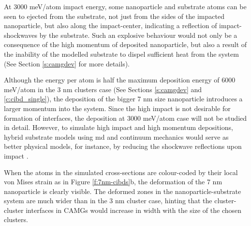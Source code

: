 At 3000 meV/atom impact energy, some nanoparticle and substrate atoms can be seen to ejected from the substrate, not just from the sides of the impacted nanoparticle, but also along the impact-center, indicating a reflection of impact-shockwaves by the substrate. Such an explosive behaviour would not only be a consequence of the high momentum of deposited nanoparticle, but also a result of the inability of the modelled substrate to dispel sufficient heat from the system (See Section \ref{s:camgdev} for more details). \par

Although the energy per atom is half the maximum deposition energy of 6000 meV/atom in the 3 nm clusters case (See Sections \ref{s:camgdev} and \ref{c:cibd_single}), the deposition of the bigger 7 nm size nanoparticle introduces a larger momentum into the system. Since the high impact is not desirable for formation of interfaces, the deposition at 3000 meV/atom case will not be studied in detail. However, to simulate high impact and high momentum depositions, hybrid substrate models using \gls{md} and continuum mechanics would serve as better physical models, for instance, by reducing the shockwave reflections upon impact \cite{Insepov1997,Allen2002}. \par

When the atoms in the simulated cross-sections are colour-coded by their local von Mises strain as in Figure \ref{f:7nm-cibds}b, the deformation of the 7 nm nanoparticle is clearly visible. The deformed zones in the nanoparticle-substrate system are much wider than in the 3 nm cluster case, hinting that the cluster-cluster interfaces in CAMGs would increase in width with the size of the chosen clusters. \par

